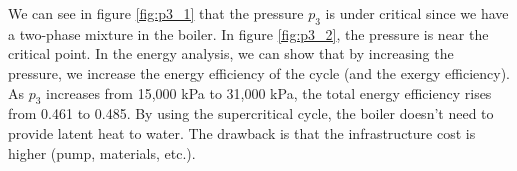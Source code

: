 We can see in figure \ref{fig:p3_1} that the pressure $p_3$ is under critical since we have a two-phase mixture in the boiler. 
In figure \ref{fig:p3_2}, the pressure is near the critical point. In the energy analysis, we can show that by increasing the pressure,
we increase the energy efficiency of the cycle (and the exergy efficiency). As $p_3$ increases from 15,000 kPa to 31,000 kPa, 
the total energy efficiency rises from 0.461 to 0.485. By using the supercritical cycle, the boiler doesn't 
need to provide latent heat to water. The drawback is that the infrastructure cost is higher (pump, materials, etc.).